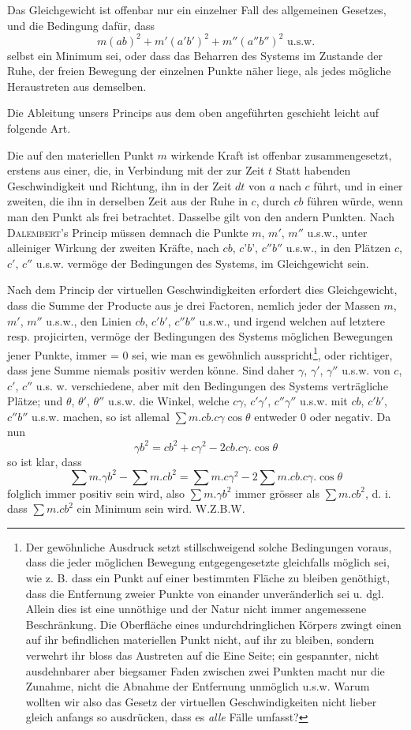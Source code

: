 \documentclass[14pt]{memoir}
\theoremstyle{plain}
\theoremstyle{remark}
\begin{document}
Das Gleichgewicht ist offenbar nur ein einzelner Fall des allgemeinen Gesetzes, und die Bedingung dafür, dass 
\[ m(ab)^2+m'(a'b')^2+m''(a''b'')^2 \text{ u.s.w.}\]
selbst ein Minimum sei, oder dass das Beharren des Systems im Zustande der Ruhe, der freien Bewegung der einzelnen Punkte näher liege, als jedes mögliche Heraustreten aus demselben. 

Die Ableitung unsers Princips aus dem oben angeführten geschieht leicht auf folgende Art. 

Die auf den materiellen Punkt \(m\) wirkende Kraft ist offenbar zusammengesetzt, erstens aus einer, die, in Verbindung mit der zur Zeit \(t\) Statt habenden Geschwindigkeit und Richtung, ihn in der Zeit \(dt\) von \(a\) nach \(c\) führt, und in einer zweiten, die ihn in derselben Zeit aus der Ruhe in \(c\), durch \(cb\) führen würde, wenn man den Punkt als frei betrachtet. Dasselbe gilt von den andern Punkten. Nach \textsc{Dalembert}'s Princip müssen demnach die Punkte \(m\), \(m'\), \(m''\) u.s.w., unter alleiniger Wirkung der zweiten Kräfte, nach \(cb\), \(c’b’\), \(c''b''\) u.s.w., in den Plätzen \(c\), \(c'\), \(c''\) u.s.w. vermöge der Bedingungen des Systems, im Gleichgewicht sein. 

Nach dem Princip der virtuellen Geschwindigkeiten erfordert dies Gleichgewicht, dass die Summe der Producte aus je drei Factoren, nemlich jeder der Massen \(m\), \(m'\), \(m''\) u.s.w., den Linien \(cb\), \(c'b'\), \(c''b''\) u.s.w., und irgend welchen auf letztere resp. projicirten, vermöge der Bedingungen des Systems möglichen Bewegungen jener Punkte, immer = 0 sei, wie man es gewöhnlich ausspricht\footnote{Der gewöhnliche Ausdruck setzt stillschweigend solche Bedingungen voraus, dass die jeder möglichen Bewegung entgegengesetzte gleichfalls möglich sei, wie z. B. dass ein Punkt auf einer bestimmten Fläche zu bleiben genöthigt, dass die Entfernung zweier Punkte von einander unveränderlich sei u. dgl. Allein dies ist eine unnöthige und der Natur nicht immer angemessene Beschränkung. Die Oberfläche eines undurchdringlichen Körpers zwingt einen auf ihr befindlichen materiellen Punkt nicht, auf ihr zu bleiben, sondern verwehrt ihr bloss das Austreten auf die Eine Seite; ein gespannter, nicht ausdehnbarer aber biegsamer Faden zwischen zwei Punkten macht nur die Zunahme, nicht die Abnahme der Entfernung unmöglich u.s.w. Warum wollten wir also das Gesetz der virtuellen Geschwindigkeiten nicht lieber gleich anfangs so ausdrücken, dass es \textit{alle} Fälle umfasst?},%
oder richtiger, dass jene Summe niemals positiv werden könne. Sind daher \(\gamma\), \(\gamma'\), \(\gamma''\) u.s.w. von \(c\), \(c'\), \(c''\) u.s. w. verschiedene, aber mit den Bedingungen des Systems verträgliche Plätze; und \(\theta\), \(\theta'\), \(\theta''\) u.s.w. die Winkel, welche \(c\gamma\), \(c'\gamma'\), \(c''\gamma''\) u.s.w. mit \(cb\), \(c'b'\), \(c''b''\) u.s.w. machen, so ist allemal \(\sum m . cb.c\gamma \cos \theta\) entweder \(0\) oder negativ. Da nun 
\[ \gamma b^2=cb^2+c\gamma^2-2cb.c\gamma.\cos \theta\]
so ist klar, dass 
\[ \sum m.\gamma b^2 - \sum m.cb^2 = \sum m.c\gamma^2-2\sum m.cb.c\gamma.\cos\theta\]
folglich immer positiv sein wird, also \(\sum m.\gamma b^2\) immer grösser als \(\sum m.cb^2\), d. i. dass \(\sum m.cb^2\) ein Minimum sein wird. W.Z.B.W. 
\end{document}
